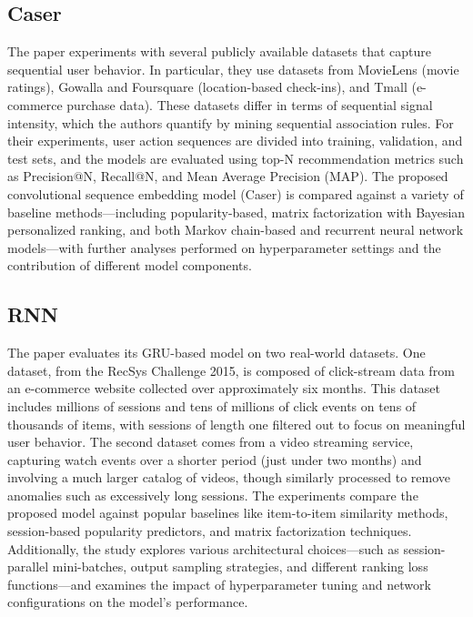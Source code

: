 \documentclass{ieeetj}
\begin{document}
\subsection{Caser\cite{tang2018personalized}}
The paper experiments with several publicly available datasets that capture sequential user behavior. In particular, they use datasets from MovieLens (movie ratings), Gowalla and Foursquare (location-based check-ins), and Tmall (e-commerce purchase data). These datasets differ in terms of sequential signal intensity, which the authors quantify by mining sequential association rules. For their experiments, user action sequences are divided into training, validation, and test sets, and the models are evaluated using top-N recommendation metrics such as Precision@N, Recall@N, and Mean Average Precision (MAP). The proposed convolutional sequence embedding model (Caser) is compared against a variety of baseline methods—including popularity-based, matrix factorization with Bayesian personalized ranking, and both Markov chain-based and recurrent neural network models—with further analyses performed on hyperparameter settings and the contribution of different model components.


\subsection{RNN\cite{hidasi2015session}}
The paper evaluates its GRU-based model on two real-world datasets. One dataset, from the RecSys Challenge 2015, is composed of click-stream data from an e-commerce website collected over approximately six months. This dataset includes millions of sessions and tens of millions of click events on tens of thousands of items, with sessions of length one filtered out to focus on meaningful user behavior. The second dataset comes from a video streaming service, capturing watch events over a shorter period (just under two months) and involving a much larger catalog of videos, though similarly processed to remove anomalies such as excessively long sessions. The experiments compare the proposed model against popular baselines like item-to-item similarity methods, session-based popularity predictors, and matrix factorization techniques. Additionally, the study explores various architectural choices—such as session-parallel mini-batches, output sampling strategies, and different ranking loss functions—and examines the impact of hyperparameter tuning and network configurations on the model's performance.
\end{document}
